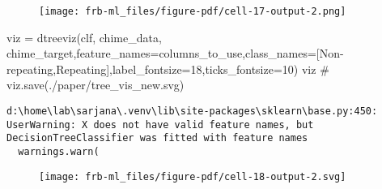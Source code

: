\documentclass[
  letterpaper,
  DIV=11,
  numbers=noendperiod]{scrartcl}
\newenvironment{Shaded}{\begin{snugshade}}{\end{snugshade}}
\newcommand{\CommentTok}[1]{\textcolor[rgb]{0.37,0.37,0.37}{#1}}
\newcommand{\DecValTok}[1]{\textcolor[rgb]{0.68,0.00,0.00}{#1}}
\newcommand{\NormalTok}[1]{\textcolor[rgb]{0.00,0.23,0.31}{#1}}
\newcommand{\OperatorTok}[1]{\textcolor[rgb]{0.37,0.37,0.37}{#1}}
\newcommand{\StringTok}[1]{\textcolor[rgb]{0.13,0.47,0.30}{#1}}
\begin{document}
\begin{figure}[H]

{\centering \texttt{[image: frb-ml\_files/figure-pdf/cell-17-output-2.png]}

}

\end{figure}

\begin{Shaded}
\begin{Highlighting}[]
\NormalTok{viz }\OperatorTok{=}\NormalTok{ dtreeviz(clf, chime\_data, chime\_target,feature\_names}\OperatorTok{=}\NormalTok{columns\_to\_use,class\_names}\OperatorTok{=}\NormalTok{[}\StringTok{\textquotesingle{}Non{-}repeating\textquotesingle{}}\NormalTok{,}\StringTok{\textquotesingle{}Repeating\textquotesingle{}}\NormalTok{],label\_fontsize}\OperatorTok{=}\DecValTok{18}\NormalTok{,ticks\_fontsize}\OperatorTok{=}\DecValTok{10}\NormalTok{)}
\NormalTok{viz}
\CommentTok{\# viz.save(\textquotesingle{}./paper/tree\_vis\_new.svg\textquotesingle{})}
\end{Highlighting}
\end{Shaded}

\begin{verbatim}
d:\home\lab\sarjana\.venv\lib\site-packages\sklearn\base.py:450: UserWarning: X does not have valid feature names, but DecisionTreeClassifier was fitted with feature names
  warnings.warn(
\end{verbatim}

\begin{figure}[H]

{\centering \texttt{[image: frb-ml\_files/figure-pdf/cell-18-output-2.svg]}

}

\end{figure}
\end{document}
